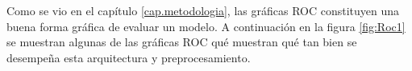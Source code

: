 \par Como se vio en el capítulo \ref{cap.metodologia}, las gráficas ROC constituyen una buena forma gráfica de evaluar un modelo. A continuación en la figura \ref{fig:Roc1} se muestran algunas de las gráficas ROC qué muestran qué tan bien se desempeña esta arquitectura y preprocesamiento.

\begin{figure}
	\begin{table}[H]
		\centering
\end{table}
\end{figure}
